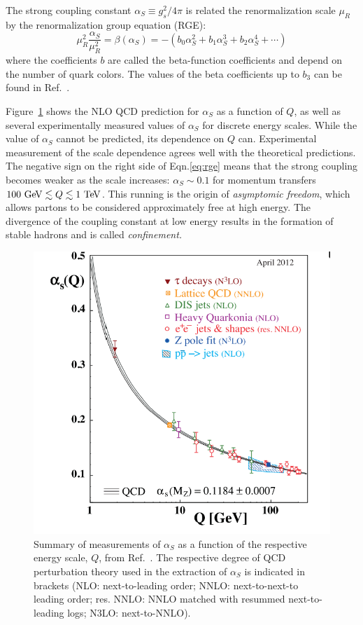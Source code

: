 The strong coupling constant $\alpha_S \equiv g_s^2/4\pi$ is related the renormalization scale $\mu_R$ by the renormalization group equation (RGE):
\begin{equation}
\mu_R^2 \frac{\alpha_S}{\mu^2_R} = \beta \left( \alpha_S \right) = -\left( b_0\alpha^2_S + b_1\alpha^3_S + b_2\alpha^4_S + \dotsb \right)
\label{eq:rge}
\end{equation}
where the coefficients $b$ are called the beta-function coefficients and depend on the number of quark colors. The values of the beta coefficients up to $b_3$ can be found in Ref.~\cite{vanRitbergen:1997va}. 

Figure~\ref{fig:alphas} shows the NLO QCD prediction for $\alpha_S$ as a function of $Q$, as well as several experimentally measured values of $\alpha_S$ for discrete energy scales. While the value of $\alpha_S$ cannot be predicted, its dependence on $Q$ can. Experimental measurement of the scale dependence agrees well with the theoretical predictions. The negative sign on the right side of Eqn.\ref{eq:rge} means that the strong coupling becomes weaker as the scale increases: $\alpha_S \sim 0.1$ for momentum transfers $100 \gev \lesssim Q \lesssim 1 \tev$. This running is the origin of \emph{asymptomic freedom}, which allows partons to be considered approximately free at high energy. The divergence of the coupling constant at low energy results in the formation of stable hadrons and is called \emph{confinement.}

\begin{figure}[h]
\includegraphics[width=\textwidth]{fig/thry/RunningAlpha.png}
\caption{Summary of measurements of $\alpha_S$ as a function of the respective energy scale, $Q$, from Ref.~\cite{PDG}. The respective degree of QCD perturbation theory used in the extraction
of $\alpha_S$ is indicated in brackets (NLO: next-to-leading order; NNLO: next-to-next-to leading order; res. NNLO: NNLO matched with resummed next-to-leading logs;
N3LO: next-to-NNLO).}
\label{fig:alphas}
\end{figure}
